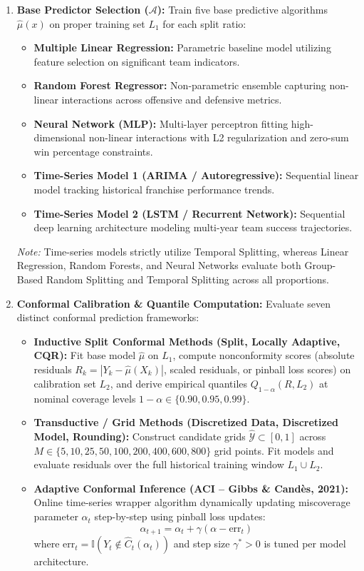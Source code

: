 \documentclass[11pt,a4paper]{article}
\begin{document}
\begin{enumerate}
    \item \textbf{Base Predictor Selection ($\mathcal{A}$):}
    Train five base predictive algorithms $\hat{\mu}(x)$ on proper training set $L_1$ for each split ratio:
    \begin{itemize}
        \item \textbf{Multiple Linear Regression:} Parametric baseline model utilizing feature selection on significant team indicators.
        \item \textbf{Random Forest Regressor:} Non-parametric ensemble capturing non-linear interactions across offensive and defensive metrics.
        \item \textbf{Neural Network (MLP):} Multi-layer perceptron fitting high-dimensional non-linear interactions with L2 regularization and zero-sum win percentage constraints.
        \item \textbf{Time-Series Model 1 (ARIMA / Autoregressive):} Sequential linear model tracking historical franchise performance trends.
        \item \textbf{Time-Series Model 2 (LSTM / Recurrent Network):} Sequential deep learning architecture modeling multi-year team success trajectories.
    \end{itemize}
    \textit{Note:} Time-series models strictly utilize Temporal Splitting, whereas Linear Regression, Random Forests, and Neural Networks evaluate both Group-Based Random Splitting and Temporal Splitting across all proportions.

    \item \textbf{Conformal Calibration \& Quantile Computation:}
    Evaluate seven distinct conformal prediction frameworks:
    \begin{itemize}
        \item \textbf{Inductive Split Conformal Methods (Split, Locally Adaptive, CQR):} Fit base model $\hat{\mu}$ on $L_1$, compute nonconformity scores (absolute residuals $R_k = |Y_k - \hat{\mu}(X_k)|$, scaled residuals, or pinball loss scores) on calibration set $L_2$, and derive empirical quantiles $Q_{1-\alpha}(R, L_2)$ at nominal coverage levels $1-\alpha \in \{0.90, 0.95, 0.99\}$.
        \item \textbf{Transductive / Grid Methods (Discretized Data, Discretized Model, Rounding):} Construct candidate grids $\hat{\mathcal{Y}} \subset [0, 1]$ across $M \in \{5, 10, 25, 50, 100, 200, 400, 600, 800\}$ grid points. Fit models and evaluate residuals over the full historical training window $L_1 \cup L_2$.
        \item \textbf{Adaptive Conformal Inference (ACI -- Gibbs \& Cand\`{e}s, 2021):} Online time-series wrapper algorithm dynamically updating miscoverage parameter $\alpha_t$ step-by-step using pinball loss updates:
        \[ \alpha_{t+1} = \alpha_t + \gamma(\alpha - \text{err}_t) \]
        where $\text{err}_t = \mathbb{I}(Y_t \notin \hat{C}_t(\alpha_t))$ and step size $\gamma^* > 0$ is tuned per model architecture.
    \end{itemize}


\end{enumerate}
\end{document}
